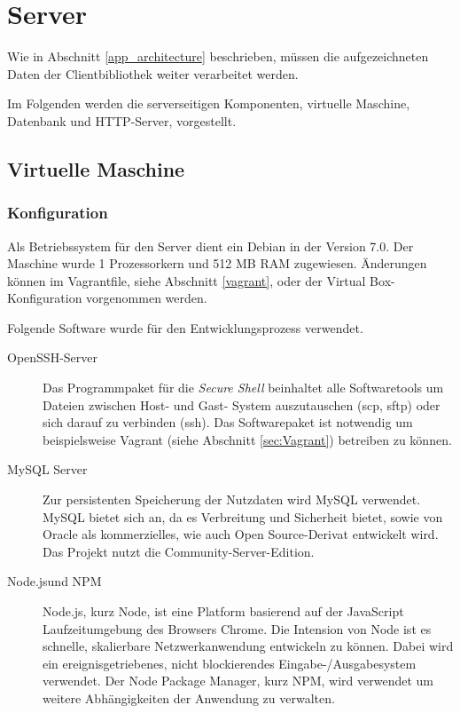 \section{Server}
\label{server}
Wie in Abschnitt \ref{app_architecture} beschrieben, müssen die aufgezeichneten Daten der Clientbibliothek weiter verarbeitet werden. %

Im Folgenden werden die serverseitigen Komponenten, virtuelle Maschine, Datenbank und HTTP-Server, vorgestellt. 



\subsection{Virtuelle Maschine}

\subsubsection{Konfiguration \label{sec:vm-config}}

Als Betriebssystem für den Server dient ein Debian in der Version 7.0. Der Maschine wurde 1 Prozessorkern und 512 MB RAM zugewiesen. Änderungen können im Vagrantfile, siehe Abschnitt \ref{vagrant}, oder der Virtual Box-Konfiguration vorgenommen werden. 

Folgende Software wurde für den Entwicklungsprozess verwendet. 
\begin{description}
	\item[OpenSSH-Server\footnotemark] 
Das Programmpaket für die \emph{Secure Shell} beinhaltet alle Softwaretools um Dateien zwischen Host- und Gast- System auszutauschen (scp, sftp) oder sich darauf zu verbinden (ssh). Das Softwarepaket ist notwendig um beispielsweise Vagrant (siehe Abschnitt \ref{sec:Vagrant}) betreiben zu können. 

	\item[MySQL Server\footnotemark]
Zur persistenten Speicherung der Nutzdaten wird MySQL verwendet. MySQL bietet sich an, da es Verbreitung und Sicherheit bietet, sowie von Oracle als kommerzielles, wie auch Open Source-Derivat entwickelt wird. Das Projekt nutzt die Community-Server-Edition.
	
	\item[Node.js\footnotemark und NPM\footnotemark]
Node.js, kurz Node, ist eine Platform basierend auf der JavaScript Laufzeitumgebung des Browsers Chrome. Die Intension von Node ist es schnelle, skalierbare Netzwerkanwendung entwickeln zu können. Dabei wird ein ereignisgetriebenes, nicht blockierendes Eingabe-/Ausgabesystem verwendet. Der Node Package Manager, kurz NPM, wird verwendet um weitere Abhängigkeiten der Anwendung zu verwalten.
	
\end{description}

